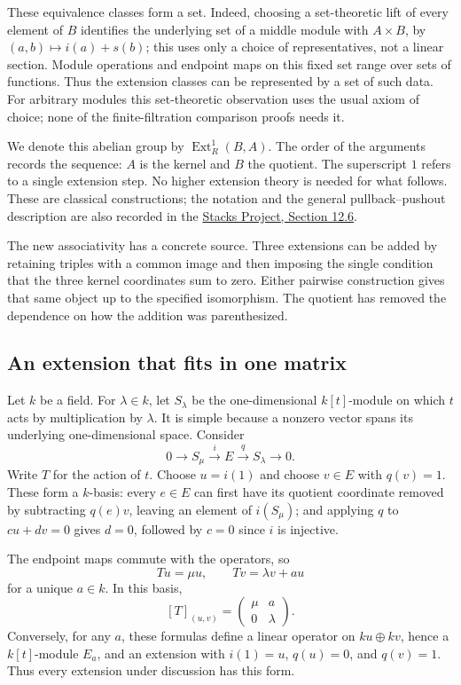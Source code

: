 \documentclass[11pt]{article}
\theoremstyle{definition}
\theoremstyle{remark}\newtheorem{remark}[theorem]{Remark}
\DeclareMathOperator{\Ext}{Ext}
\begin{document}
These equivalence classes form a set. Indeed, choosing a set-theoretic
lift of every element of $B$ identifies the underlying set of a middle
module with $A\times B$, by $(a,b)\mapsto i(a)+s(b)$; this uses only
a choice of representatives, not a linear section. Module operations
and endpoint maps on this fixed set range over sets of functions.
Thus the extension classes can be represented by a set of such data.
For arbitrary modules this set-theoretic observation uses the usual
axiom of choice; none of the finite-filtration comparison proofs needs it.

We denote this abelian group by $\Ext^1_R(B,A)$. The order of the
arguments records the sequence: $A$ is the kernel and $B$ the quotient.
The superscript $1$ refers to a single extension step. No higher
extension theory is needed for what follows. These are classical
constructions; the notation and the general pullback--pushout description
are also recorded in the \href{https://stacks.math.columbia.edu/tag/010I}
{Stacks Project, Section 12.6}.

The new associativity has a concrete source. Three extensions can be
added by retaining triples with a common image and then imposing the
single condition that the three kernel coordinates sum to zero. Either
pairwise construction gives that same object up to the specified
isomorphism. The quotient has removed the dependence on how the addition
was parenthesized.

\subsection{An extension that fits in one matrix}\label{x:operator-extensions}

Let $k$ be a field. For $\lambda\in k$, let $S_\lambda$ be the
one-dimensional $k[t]$-module on which $t$ acts by multiplication by
$\lambda$. It is simple because a nonzero vector spans its underlying
one-dimensional space. Consider
\[
0\longrightarrow S_\mu\xrightarrow{i}E\xrightarrow{q}S_\lambda
\longrightarrow0.
\]
Write $T$ for the action of $t$. Choose $u=i(1)$ and choose $v\in E$
with $q(v)=1$. These form a $k$-basis: every $e\in E$ can first have its
quotient coordinate removed by subtracting $q(e)v$, leaving an element
of $i(S_\mu)$; and applying $q$ to $cu+dv=0$ gives $d=0$, followed by
$c=0$ since $i$ is injective.

The endpoint maps commute with the operators, so
\[
Tu=\mu u,\qquad Tv=\lambda v+a u
\]
for a unique $a\in k$. In this basis,
\[
[T]_{(u,v)}=\begin{pmatrix}\mu&a\\0&\lambda\end{pmatrix}.
\]
Conversely, for any $a$, these formulas define a linear operator on
$ku\oplus kv$, hence a $k[t]$-module $E_a$, and an extension with
$i(1)=u$, $q(u)=0$, and $q(v)=1$. Thus every extension under discussion
has this form.
\end{document}
